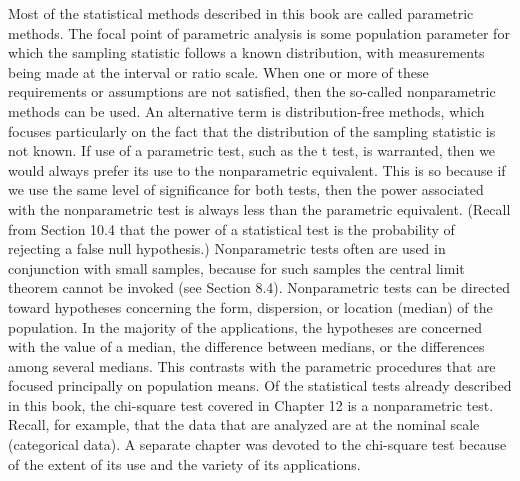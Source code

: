 Most of the statistical methods described in this book are called parametric methods. The focal point of
parametric analysis is some population parameter for which the sampling statistic follows a known distribution,
with measurements being made at the interval or ratio scale. When one or more of these requirements or
assumptions are not satisfied, then the so-called nonparametric methods can be used. An alternative term is
distribution-free methods, which focuses particularly on the fact that the distribution of the sampling statistic is
not known.
If use of a parametric test, such as the t test, is warranted, then we would always prefer its use to the
nonparametric equivalent. This is so because if we use the same level of significance for both tests, then the
power associated with the nonparametric test is always less than the parametric equivalent. (Recall from
Section 10.4 that the power of a statistical test is the probability of rejecting a false null hypothesis.)
Nonparametric tests often are used in conjunction with small samples, because for such samples the central
limit theorem cannot be invoked (see Section 8.4).
Nonparametric tests can be directed toward hypotheses concerning the form, dispersion, or location
(median) of the population. In the majority of the applications, the hypotheses are concerned with the value of a
median, the difference between medians, or the differences among several medians. This contrasts with the
parametric procedures that are focused principally on population means.
Of the statistical tests already described in this book, the chi-square test covered in Chapter 12 is a
nonparametric test. Recall, for example, that the data that are analyzed are at the nominal scale (categorical
data). A separate chapter was devoted to the chi-square test because of the extent of its use and the variety of its
applications.
